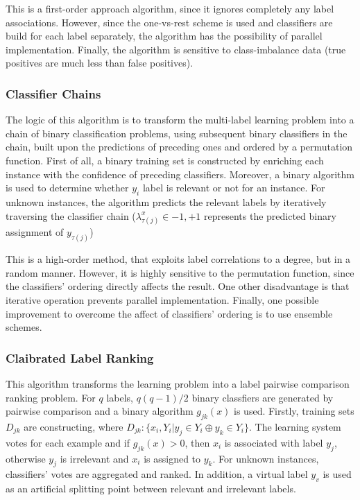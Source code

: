 \documentclass[12pt]{report}
\begin{document}
	This is a first-order approach algorithm, since it ignores completely any label associations. However, since the one-vs-rest scheme is used and classifiers are build for each label separately, the algorithm has the possibility of parallel implementation. Finally, the algorithm is sensitive to class-imbalance data (true positives are much less than false positives).
	
	\subsubsection*{Classifier Chains}
	The logic of this algorithm is to transform the multi-label learning problem into a chain of binary classification problems, using subsequent binary classifiers in the chain, built upon the predictions of preceding ones and ordered by a permutation function. First of all, a binary training set is constructed by enriching each instance with the confidence of preceding classifiers. Moreover, a binary algorithm is used to determine whether $y_i$ label is relevant or not for an instance. For unknown instances, the algorithm predicts the relevant labels by iteratively traversing the classifier chain ($\lambda _{\tau(j)}^x \in {-1, +1}$ represents the predicted binary assignment of $y_{\tau(j)}$)
	
	This is a high-order method, that exploits label correlations to a degree, but in a random manner. However, it is highly sensitive to the permutation function, since the classifiers' ordering directly affects the result. One other disadvantage is that iterative operation prevents parallel implementation. Finally, one possible improvement to overcome the affect of classifiers' ordering is to use ensemble schemes.
	
	\subsubsection*{Claibrated Label Ranking}
	This algorithm transforms the learning problem into a label pairwise comparison ranking problem. For $q$ labels, $q(q-1)/2$ binary classfiers are generated by pairwise comparison and a binary algorithm $g_{jk}(x)$ is used. Firstly, training sets $D_{jk}$ are constructing, where $D_{jk}: \{x_i, Y_i | y_j \in Y_i \oplus y_k \in Y_i\}$. The learning system votes for each example and if $g_{jk}(x)>0$, then $x_i$ is associated with label $y_j$, otherwise $y_j$ is irrelevant and $x_i$ is assigned to $y_k$. For unknown instances, classifiers' votes are aggregated and ranked. In addition, a virtual label $y_v$ is used as an artificial splitting point between relevant and irrelevant labels.
	
\end{document}
